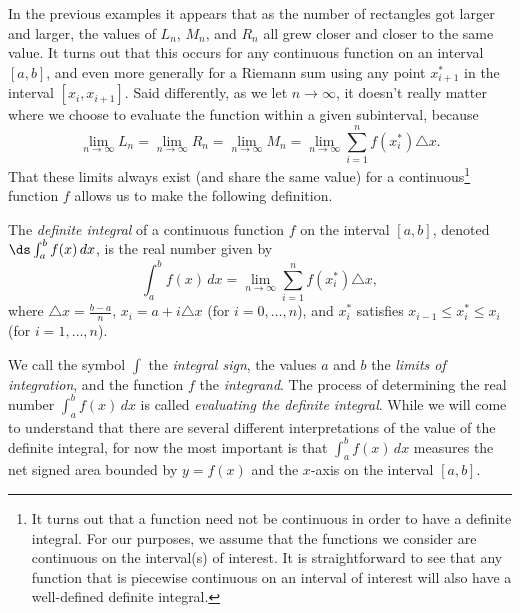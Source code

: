 In the previous examples it appears that as the number of rectangles got larger and larger, the values of $L_n$, $M_n$, and $R_n$ all grew closer and closer to the same value.  It turns out that this occurs for any continuous function on an interval $[a,b]$, and even more generally for a Riemann sum using any point $x_{i+1}^*$ in the interval $[x_i, x_{i+1}]$.  Said differently, as we let $n \to \infty$, it doesn't really matter where we choose to evaluate the function within a given subinterval, because
$$\lim_{n \to \infty} L_n = \lim_{n \to \infty} R_n = \lim_{n \to \infty} M_n = \lim_{n \to \infty} \sum_{i=1}^{n} f(x_i^*) \triangle x.$$  
That these limits always exist (and share the same value) for a continuous\footnote{It turns out that a function need not be continuous in order to have a definite integral.  For our purposes, we assume that the functions we consider are continuous on the interval(s) of interest.  It is straightforward to see that any function that is piecewise continuous on an interval of interest will also have a well-defined definite integral.} function $f$ allows us to make the following definition.
\begin{definition} \label{D:4.3.DefInt}
The \emph{definite integral} of a continuous function $f$ on the interval $[a,b]$, denoted $\ds \int_a^b f(x) \, dx$, is the real number given by
$$\int_a^b f(x) \, dx = \lim_{n \to \infty} \sum_{i=1}^{n} f(x_i^*) \triangle x,$$
where $\triangle x = \frac{b-a}{n}$, $x_i = a + i\triangle x$ (for $i = 0, \ldots, n$), and $x_i^*$ satisfies $x_{i-1} \le x_i^* \le x_i$ (for $i = 1, \ldots, n$).
\end{definition}
We call the symbol $\int$ the \emph{integral sign}, the values $a$ and $b$ the \emph{limits of integration}, and the function $f$ the \emph{integrand}.  The process of determining the real number $\int_a^b f(x) \, dx$ is called \emph{evaluating the definite integral}.  While we will come to understand that there are several different interpretations of the value of the definite integral, for now the most important is that $\int_a^b f(x) \, dx$ measures the net signed area bounded by $y = f(x)$ and the $x$-axis on the interval $[a,b]$.  
